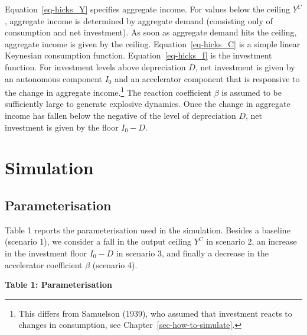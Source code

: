 \documentclass[
  letterpaper,
  DIV=11,
  numbers=noendperiod]{scrreprt}
\begin{document}
Equation~\ref{eq-hicks_Y} specifies aggregate income. For values below
the ceiling \(Y^C\), aggregate income is determined by aggregate demand
(consisting only of consumption and net investment). As soon as
aggregate demand hits the ceiling, aggregate income is given by the
ceiling. Equation~\ref{eq-hicks_C} is a simple linear Keynesian
consumption function. Equation~\ref{eq-hicks_I} is the investment
function. For investment levels above depreciation \(D\), net investment
is given by an autonomous component \(I_0\) and an accelerator component
that is responsive to the change in aggregate income.\footnote{ This
  differs from Samuelson (1939), who assumed that investment reacts to
  changes in consumption, see Chapter~\ref{sec-how-to-simulate}.} The
reaction coefficient \(\beta\) is assumed to be sufficiently large to
generate explosive dynamics. Once the change in aggregate income has
fallen below the negative of the level of depreciation \(D\), net
investment is given by the floor \(I_0 - D\).

\section{Simulation}\label{simulation-13}

\subsection{Parameterisation}\label{parameterisation-13}

Table 1 reports the parameterisation used in the simulation. Besides a
baseline (scenario 1), we consider a fall in the output ceiling \(Y^C\)
in scenario 2, an increase in the investment floor \(I_0 - D\) in
scenario 3, and finally a decrease in the accelerator coefficient
\(\beta\) (scenario 4).

\textbf{Table 1: Parameterisation}
\end{document}
